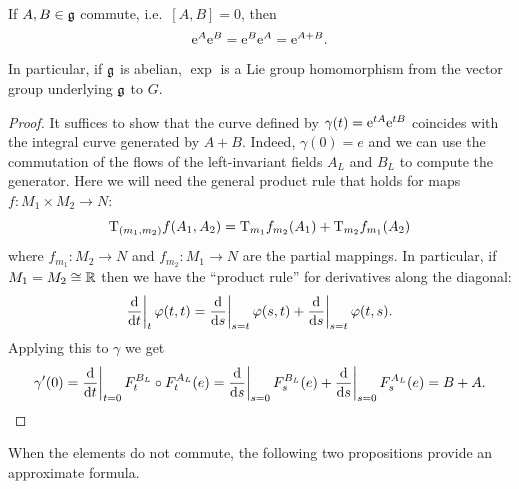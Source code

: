 \begin{prop}
    If $A,B\in\mathfrak{g}$ commute, i.e.~$[A,B]=0$, then
    \[\mathrm{e}^A\mathrm{e}^B=\mathrm{e}^B\mathrm{e}^A=\mathrm{e}^{A+B}.\]
    In particular, if $\mathfrak{g}$ is abelian, $\exp$ is a Lie group homomorphism from the vector group underlying $\mathfrak{g}$ to $G$.
\end{prop}
\begin{proof}
    It suffices to show that the curve defined by $\gamma(t)=\mathrm{e}^{tA}\mathrm{e}^{tB}$ coincides with the integral curve generated by $A+B$. Indeed, $\gamma(0)=e$ and we can use the commutation of the flows of the left-invariant fields $A_L$ and $B_L$ to compute the generator. Here we will need the general product rule that holds for maps $f:M_1\times M_2\to N$:
    \[\mathrm{T}_{(m_1,m_2)}f(A_1,A_2)=\mathrm{T}_{m_1}f_{m_2}(A_1)+\mathrm{T}_{m_2}f_{m_1}(A_2)\]
    where $f_{m_1}:M_2\to N$ and $f_{m_2}:M_1\to N$ are the partial mappings. In particular, if $M_1=M_2\cong \mathbb{R}$ then we have the ``product rule'' for derivatives along the diagonal:
    \[\restr{\frac{\dd}{\dd t}}{t}\varphi(t,t)=\restr{\frac{\dd}{\dd s}}{s=t}\varphi(s,t)+\restr{\frac{\dd}{\dd s}}{s=t}\varphi(t,s).\]
    Applying this to $\gamma$ we get 
    \begin{multline}
        \gamma'(0)=\restr{\frac{\dd}{\dd t}}{t=0} F^{B_L}_t\circ F^{A_L}_t (e)=\restr{\frac{\dd}{\dd s}}{s=0}F^{B_L}_{s}(e)+\restr{\frac{\dd}{\dd s}}{s=0}F^{A_L}_{s}(e)=B+A.
    \end{multline}
\end{proof}

When the elements do not commute, the following two propositions provide an approximate formula.

